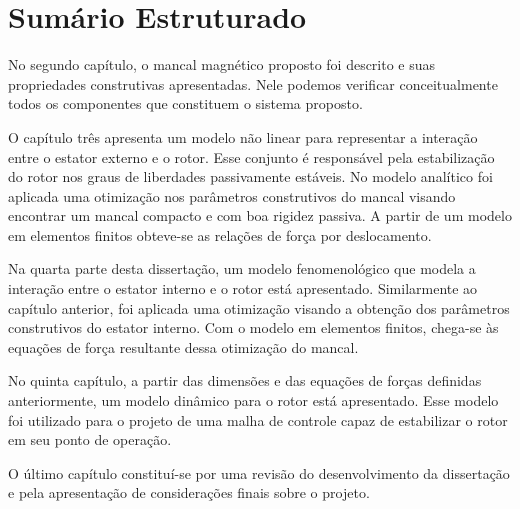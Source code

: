 \section{Sumário Estruturado}
 
No segundo capítulo, o mancal magnético proposto foi descrito e suas propriedades construtivas apresentadas. Nele podemos verificar conceitualmente todos os componentes que constituem o sistema proposto.

O capítulo três apresenta um modelo não linear para representar a interação entre o estator externo e o rotor. Esse conjunto é responsável pela estabilização do rotor nos graus de liberdades passivamente estáveis. No modelo analítico foi aplicada uma otimização nos parâmetros construtivos do mancal visando encontrar um mancal compacto e com boa rigidez passiva. A partir de um modelo em elementos finitos obteve-se as relações de força por deslocamento.

Na quarta parte desta dissertação, um modelo fenomenológico que modela a interação entre o estator interno e o rotor está apresentado. Similarmente ao capítulo anterior, foi aplicada uma otimização visando a obtenção dos parâmetros construtivos do estator interno. Com o modelo em elementos finitos, chega-se às equações de força resultante dessa otimização do mancal.  

No quinta capítulo, a partir das dimensões e das equações de forças definidas anteriormente, um modelo dinâmico para o rotor está apresentado. Esse modelo foi utilizado para o projeto de uma malha de controle capaz de estabilizar o rotor em seu ponto de operação.

O último capítulo constituí-se por uma revisão do desenvolvimento da dissertação e pela apresentação de considerações finais sobre o projeto.


